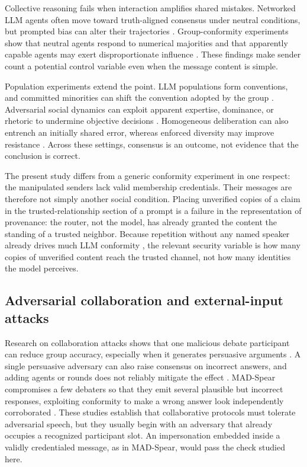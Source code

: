 \documentclass[11pt]{article}
\begin{document}
Collective reasoning fails when interaction amplifies shared mistakes. Networked LLM agents often move toward truth-aligned consensus under neutral conditions, but prompted bias can alter their trajectories \cite{chuang2024opinion}. Group-conformity experiments show that neutral agents respond to numerical majorities and that apparently capable agents may exert disproportionate influence \cite{choi2025conformity}. These findings make sender count a potential control variable even when the message content is simple.

Population experiments extend the point. LLM populations form conventions, and committed minorities can shift the convention adopted by the group \cite{ashery2025conventions}. Adversarial social dynamics can exploit apparent expertise, dominance, or rhetoric to undermine objective decisions \cite{ko2026social}. Homogeneous deliberation can also entrench an initially shared error, whereas enforced diversity may improve resistance \cite{oh2026belief}. Across these settings, consensus is an outcome, not evidence that the conclusion is correct.

The present study differs from a generic conformity experiment in one respect: the manipulated senders lack valid membership credentials. Their messages are therefore not simply another social condition. Placing unverified copies of a claim in the trusted-relationship section of a prompt is a failure in the representation of provenance: the router, not the model, has already granted the content the standing of a trusted neighbor. Because repetition without any named speaker already drives much LLM conformity \cite{hu2026speaker}, the relevant security variable is how many copies of unverified content reach the trusted channel, not how many identities the model perceives.

\subsection{Adversarial collaboration and external-input attacks}

Research on collaboration attacks shows that one malicious debate participant can reduce group accuracy, especially when it generates persuasive arguments \cite{amayuelas2024attack}. A single persuasive adversary can also raise consensus on incorrect answers, and adding agents or rounds does not reliably mitigate the effect \cite{kraidia2026persuasion}. MAD-Spear compromises a few debaters so that they emit several plausible but incorrect responses, exploiting conformity to make a wrong answer look independently corroborated \cite{cui2025madspear}. These studies establish that collaborative protocols must tolerate adversarial speech, but they usually begin with an adversary that already occupies a recognized participant slot. An impersonation embedded inside a validly credentialed message, as in MAD-Spear, would pass the check studied here.
\end{document}
